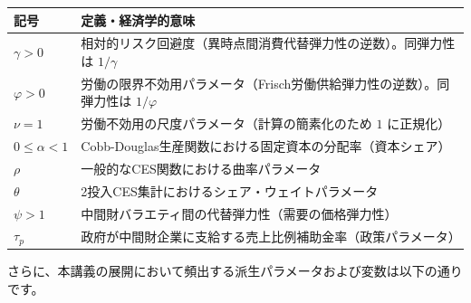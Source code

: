 \documentclass[
  japanese,
  lualatex,
  ja=standard,
  12pt,
  a4paper]{ltjsarticle}
\newcounter{none} %
\begin{document}
{\def\LTcaptype{none} %
\begin{longtable}[]{@{}
  >{\raggedright\arraybackslash}p{}
  >{\raggedright\arraybackslash}p{}@{}}
\toprule\noalign{}
\begin{minipage}[b]{\linewidth}\raggedright
記号
\end{minipage} & \begin{minipage}[b]{\linewidth}\raggedright
定義・経済学的意味
\end{minipage} \\
\midrule\noalign{}
\endhead
\bottomrule\noalign{}
\endlastfoot
\(\gamma > 0\) &
相対的リスク回避度（異時点間消費代替弾力性の逆数）。同弾力性は
\(1/\gamma\) \\
\(\varphi > 0\) &
労働の限界不効用パラメータ（Frisch労働供給弾力性の逆数）。同弾力性は
\(1/\varphi\) \\
\(\nu = 1\) & 労働不効用の尺度パラメータ（計算の簡素化のため \(1\)
に正規化） \\
\(0 \leq \alpha < 1\) &
Cobb-Douglas生産関数における固定資本の分配率（資本シェア） \\
\(\rho\) & 一般的なCES関数における曲率パラメータ \\
\(\theta\) & 2投入CES集計におけるシェア・ウェイトパラメータ \\
\(\psi > 1\) & 中間財バラエティ間の代替弾力性（需要の価格弾力性） \\
\(\tau_p\) &
政府が中間財企業に支給する売上比例補助金率（政策パラメータ） \\
\end{longtable}
}

さらに、本講義の展開において頻出する派生パラメータおよび変数は以下の通りです。
\end{document}
